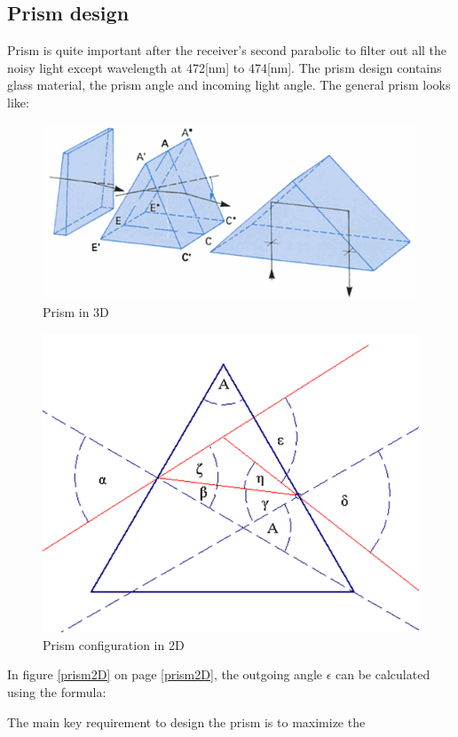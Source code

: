 \subsection{Prism design}
\label{prism}
Prism is quite important after the receiver's second parabolic to filter out all the noisy light except wavelength at 472[nm] to 474[nm]. The prism design contains glass material, the prism angle and incoming light angle. The general prism looks like:
\begin{figure}[ht!]
\centering
\includegraphics[scale = 1]{chapters/img/prism3D.png}
\caption{Prism in 3D}
\label{fig:prism3D}
\end{figure} 
\begin{figure}[ht!]
\centering
\includegraphics[scale = 1]{chapters/img/prism2D.png}
\caption{Prism configuration in 2D}
\label{fig:prism2D}
\end{figure} 
In figure \ref{prism2D} on page \ref{prism2D}, the outgoing angle $\epsilon$ can be calculated using the formula:

The main key requirement to design the prism is to maximize the 
